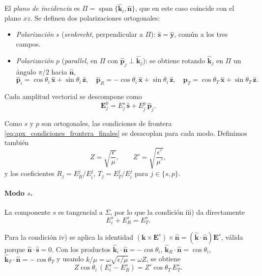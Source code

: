 El \textit{plano de incidencia} es $\Pi = \operatorname{span}\{\hat{\mathbf{k}}_i, \hat{\mathbf{n}}\}$, que en este caso coincide con el plano $xz$. Se definen dos polarizaciones ortogonales:
\begin{itemize}
\item \textit{Polarización $s$} (\textit{senkrecht}, perpendicular a $\Pi$): $\hat{\mathbf{s}} = \hat{\mathbf{y}}$, común a los tres campos.
\item \textit{Polarización $p$} (\textit{parallel}, en $\Pi$ con $\hat{\mathbf{p}}_j \perp \hat{\mathbf{k}}_j$): se obtiene rotando $\hat{\mathbf{k}}_j$ en $\Pi$ un ángulo $\pi/2$ hacia $\hat{\mathbf{n}}$,
\begin{equation}
\hat{\mathbf{p}}_i = \cos\theta_i\,\hat{\mathbf{x}} + \sin\theta_i\,\hat{\mathbf{z}},
\quad
\hat{\mathbf{p}}_R = -\cos\theta_i\,\hat{\mathbf{x}} + \sin\theta_i\,\hat{\mathbf{z}},
\quad
\hat{\mathbf{p}}_T = \cos\theta_T\,\hat{\mathbf{x}} + \sin\theta_T\,\hat{\mathbf{z}}.
\label{eq:apx_pvectors}
\end{equation}
\end{itemize}

Cada amplitud vectorial se descompone como
\begin{equation}
\mathbf{E}_j^0 = E_j^s\,\hat{\mathbf{s}} + E_j^p\,\hat{\mathbf{p}}_j.
\label{eq:apx_descomposicion_sp}
\end{equation}

Como $s$ y $p$ son ortogonales, las condiciones de frontera \eqref{eq:apx_condiciones_frontera_finales} se desacoplan para cada modo. Definimos también
\begin{equation}
Z = \sqrt{\frac{\epsilon}{\mu}},
\qquad
Z' = \sqrt{\frac{\epsilon'}{\mu'}},
\label{eq:apx_def_Z}
\end{equation}
y los coeficientes $R_j = E_R^j/E_i^j$, $T_j = E_T^j/E_i^j$ para $j \in \{s, p\}$.

\paragraph{Modo $s$.}

La componente $s$ es tangencial a $\Sigma$, por lo que la condición iii) da directamente
\begin{equation}
E_i^s + E_R^s = E_T^s.
\label{eq:apx_cond_s_E}
\end{equation}

Para la condición iv) se aplica la identidad $(\mathbf{k}\times\mathbf{E}^s)\times\hat{\mathbf{n}} = (\hat{\mathbf{k}}\cdot\hat{\mathbf{n}})\mathbf{E}^s$, válida porque $\hat{\mathbf{n}}\cdot\hat{\mathbf{s}} = 0$. Con los productos $\hat{\mathbf{k}}_i\cdot\hat{\mathbf{n}} = -\cos\theta_i$, $\hat{\mathbf{k}}_R\cdot\hat{\mathbf{n}} = \cos\theta_i$, $\hat{\mathbf{k}}_T\cdot\hat{\mathbf{n}} = -\cos\theta_T$ y usando $k/\mu = \omega\sqrt{\epsilon/\mu} = \omega Z$, se obtiene
\begin{equation}
Z\cos\theta_i\,(E_i^s - E_R^s) = Z'\cos\theta_T\,E_T^s.
\label{eq:apx_cond_s_H}
\end{equation}

